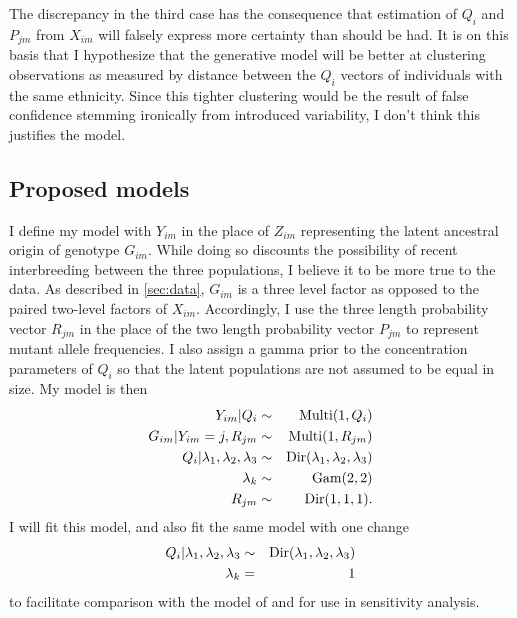 \documentclass{article}
\begin{document}
The discrepancy in the third case has the consequence that estimation of $Q_i$ and $P_{jm}$ from $X_{im}$ will falsely express more certainty than should be had. It is on this basis that I hypothesize that the generative model will be better at clustering observations as measured by distance between the $Q_i$ vectors of individuals with the same ethnicity. Since this tighter clustering would be the result of false confidence stemming ironically from introduced variability, I don't think this justifies the model.

\subsection{Proposed models}

I define my model with $Y_{im}$ in the place of $Z_{im}$ representing the latent ancestral origin of genotype $G_{im}$. While doing so discounts the possibility of recent interbreeding between the three populations, I believe it to be more true to the data. As described in \ref{sec:data}, $G_{im}$ is a three level factor as opposed to the paired two-level factors of $X_{im}$. Accordingly, I use the three length probability vector $R_{jm}$ in the place of the two length probability vector $P_{jm}$ to represent mutant allele frequencies. I also assign a gamma prior to the concentration parameters of $Q_i$ so that the latent populations are not assumed to be equal in size. My model is then
\begin{eqnarray}
Y_{im} | Q_i &\sim& \text{Multi}(1, Q_i)\\
G_{im} | Y_{im} = j, R_{jm} &\sim& \text{Multi}(1, R_{jm}) \notag\\
Q_i | \lambda_1, \lambda_2, \lambda_3 &\sim& \text{Dir}(\lambda_1, \lambda_2, \lambda_3) \notag\\
\lambda_k &\sim& \text{Gam}(2, 2) \notag \\
R_{jm} &\sim& \text{Dir}(1, 1, 1). \notag
\end{eqnarray}
I will fit this model, and also fit the same model with one change
\begin{eqnarray}
Q_i | \lambda_1, \lambda_2, \lambda_3 &\sim& \text{Dir}(\lambda_1, \lambda_2, \lambda_3) \\
\lambda_k &=& 1 \notag
\end{eqnarray}
to facilitate comparison with the model of \cite{efron2016CASI} and for use in sensitivity analysis.
\end{document}

